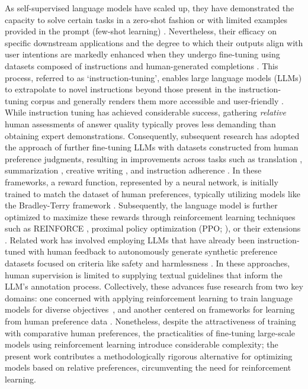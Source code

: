 As self-supervised language models have scaled up, they have demonstrated the capacity to solve certain tasks in a zero-shot fashion \citep{radford2019language} or with limited examples provided in the prompt (few-shot learning) \citep{gpt3,megatron,chowdhery2022palm}. Nevertheless, their efficacy on specific downstream applications and the degree to which their outputs align with user intentions are markedly enhanced when they undergo fine-tuning using datasets composed of instructions and human-generated completions \citep{mishra-etal-2022-cross,sanh2022multitask,chung2022scaling,thoppilan2022lamda}. This process, referred to as `instruction-tuning', enables large language models (LLMs) to extrapolate to novel instructions beyond those present in the instruction-tuning corpus and generally renders them more accessible and user-friendly \citep{chung2022scaling}. While instruction tuning has achieved considerable success, gathering \textit{relative} human assessments of answer quality typically proves less demanding than obtaining expert demonstrations. Consequently, subsequent research has adopted the approach of further fine-tuning LLMs with datasets constructed from human preference judgments, resulting in improvements across tasks such as translation \citep{kreutzer-etal-2018-reliability}, summarization \citep{stiennon2022learning,ziegler2020finetuning}, creative writing \citep{ziegler2020finetuning}, and instruction adherence \citep{ouyang2022training,ramamurthy2023is}. In these frameworks, a reward function, represented by a neural network, is initially trained to match the dataset of human preferences, typically utilizing models like the Bradley-Terry framework \citep{bradley1952rankanalysis}. Subsequently, the language model is further optimized to maximize these rewards through reinforcement learning techniques such as REINFORCE \citep{williams1992reinforce}, proximal policy optimization (PPO; \cite{schulman2017proximal}), or their extensions \citep{ramamurthy2023is}. Related work has involved employing LLMs that have already been instruction-tuned with human feedback to autonomously generate synthetic preference datasets focused on criteria like safety and harmlessness \citep{bai2022constitutional}. In these approaches, human supervision is limited to supplying textual guidelines that inform the LLM’s annotation process. Collectively, these advances fuse research from two key domains: one concerned with applying reinforcement learning to train language models for diverse objectives~\citep{Ranzato2015SequenceLT,paulus2018a,wu2018learning}, and another centered on frameworks for learning from human preference data \citep{christiano2017deep,kupcsik2018learning}. Nonetheless, despite the attractiveness of training with comparative human preferences, the practicalities of fine-tuning large-scale models using reinforcement learning introduce considerable complexity; the present work contributes a methodologically rigorous alternative for optimizing models based on relative preferences, circumventing the need for reinforcement learning.

